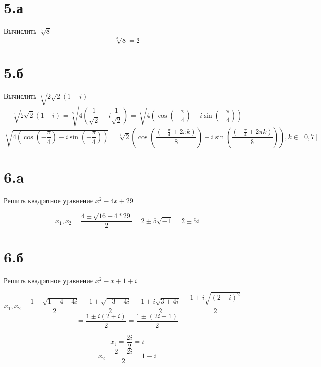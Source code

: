 \documentclass[a4paper]{article}
\begin{document}
\section*{5.а}
Вычислить $\sqrt[3]{8}$
$$\sqrt[3]{8} = 2$$

\section*{5.б}
Вычислить $\sqrt[8]{2\sqrt{2}(1 - i)}$
$$\sqrt[8]{2\sqrt{2}(1 - i)} = \sqrt[8]{4(\frac{1}{\sqrt{2}} - i\frac{1}{\sqrt{2}})} = \sqrt[8]{4(\cos(-\frac{\pi}{4}) - i\sin(-\frac{\pi}{4}))}$$
$$\sqrt[8]{4(\cos(-\frac{\pi}{4}) - i\sin(-\frac{\pi}{4}))} =\sqrt[4]{2} (\cos(\frac{(-\frac{\pi}{4} + 2 \pi k)}{8}) - i\sin(\frac{(-\frac{\pi}{4} + 2 \pi k)}{8})), k \in [0, 7] $$

\section*{6.a}
Решить квадратное уравнение $x^2 - 4x	 + 29$


$$x_1, x_2 = \frac{4 \pm \sqrt{16-  4 * 29}}{2} = 2 \pm 5 \sqrt{-1} = 2 \pm 5 i$$
\section*{6.б}
Решить квадратное уравнение $x^2 - x	 + 1 + i$


$$x_1, x_2 = \frac{1 \pm \sqrt{1 -  4 - 4i}}{2} =\frac{1 \pm \sqrt{-3 - 4i}}{2} = \frac{1 \pm i\sqrt{3 + 4i}}{2} = \frac{1 \pm i\sqrt{(2 + i)^2}}{2}= $$
$$=\frac{1 \pm i(2 + i)}{2} =\frac{1 \pm (2i - 1)}{2} $$

$$x_1 = \frac{2i}{2} = i$$
$$x_2 = \frac{2 - 2i}{2} = 1- i$$
\end{document}
